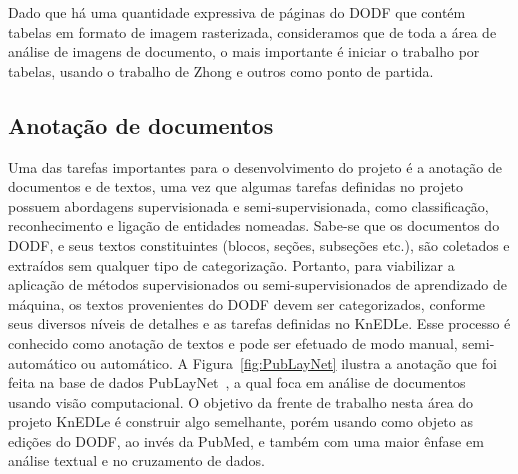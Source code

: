 \documentclass[12pt]{article}
\begin{document}
Dado que há uma quantidade expressiva de páginas do DODF que contém tabelas em formato
de imagem rasterizada, consideramos que de toda a área de análise de imagens de documento,
o mais importante é iniciar o trabalho por tabelas, usando o trabalho de Zhong e outros \cite{zhong_etal_PubTabNet_arXiv2019} como ponto de partida.

\subsection{Anotação de documentos}

Uma das tarefas importantes para o desenvolvimento do projeto é a anotação de documentos e de textos, uma vez que algumas tarefas definidas no projeto possuem abordagens supervisionada e semi-supervisionada, como classificação, reconhecimento e ligação de entidades nomeadas. Sabe-se que os documentos do DODF, e seus textos constituintes (blocos, seções, subseções etc.), são coletados e extraídos sem qualquer tipo de categorização. Portanto, para viabilizar a aplicação de métodos supervisionados ou semi-supervisionados de aprendizado de máquina, os textos provenientes do DODF devem ser categorizados, conforme seus diversos níveis de detalhes e as tarefas definidas no KnEDLe. Esse processo é conhecido como anotação de textos e pode ser efetuado de modo manual, semi-automático ou automático. A Figura~\ref{fig:PubLayNet} ilustra a anotação que foi feita na base de dados PubLayNet~\cite{zhong_etal_PubLayNet_icdar2019}, a qual foca 
em análise de documentos usando visão computacional. O objetivo da frente
de trabalho nesta área do projeto KnEDLe é construir algo semelhante, porém usando
como objeto as edições do DODF, ao invés da PubMed, e também com uma maior ênfase
em análise textual e no cruzamento de dados.
\end{document}
